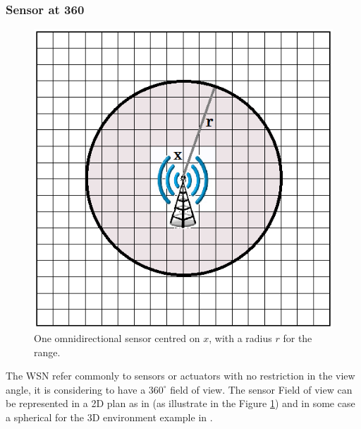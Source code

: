 \subsubsection{Sensor at 360}
%
	\begin{figure}[t!]
	\center
{}
   \includegraphics[width=\linewidth]{img/WsnSensor1.png}
  \caption{ One omnidirectional sensor centred on $x$, with a radius $r$ for the range.}\label{fig:WsnSensor1}
  \endminipage\hfill
\end{figure}

	

The WSN refer commonly to sensors or actuators  with no restriction in the view angle, it is considering to have a $360^\circ$ field of view. The sensor Field of view can be represented in a 2D plan  as in \cite{200*kulkarni2011, 174*zhang2016,150*chakrabarty2002} (as illustrate in the Figure \ref{fig:WsnSensor1}) and in some case a spherical for the 3D environment example in \cite{175*medhi2013,59*wang2008}.  

